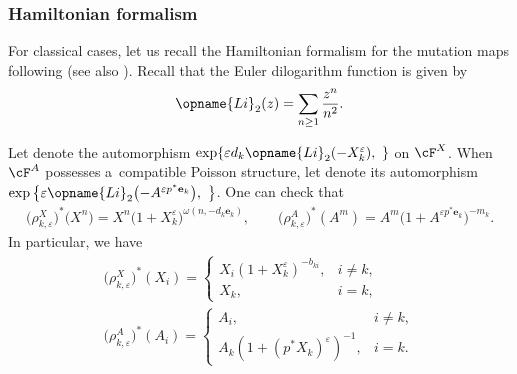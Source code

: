 \documentclass[pdftex]{sigma}
\newcommand{\Li}{\opname{Li}}
\newcommand{\ee}{\mathbf{e}}
\numberwithin{equation}{section}
\begin{document}
\subsubsection*{Hamiltonian formalism}

For classical cases, let us recall the Hamiltonian formalism for the mutation maps following
\cite{gekhtman2017hamiltonian} (see also \cite{FockGoncharov09a,gross2018canonical}). Recall that the Euler dilogarithm function
is given by
\begin{align*}
\Li_{2}(z) =\sum_{n\geq1}\frac{z^{n}}{n^{2}}.
\end{align*}

Let  denote the automorphism $\exp\{\varepsilon d_{k}\Li_{2}(-X_{k}^{\varepsilon}),\ \}$
on $\cF^{X}$. When $\cF^{A}$ possesses a~compatible Poisson structure,
let  denote its automorphism $\exp\big\{\varepsilon\Li_{2}\bigl(-A^{\varepsilon p^{*}\ee_{k}}\bigr),\ \big\}$.
One can check that
\begin{gather*}
\big(\rho_{k,\varepsilon}^{X})^{*}(X^{n}\big) = X^{n}\big(1+X_{k}^{\varepsilon}\big)^{\omega(n,-d_{k}\ee_{k})},\qquad
\big(\rho_{k,\varepsilon}^{A}\big)^{*}(A^{m}) = A^{m}\big(1+A^{\varepsilon p^{*}\ee_{k}}\big)^{-m_{k}}.
\end{gather*}
In particular, we have
\begin{gather*}
\big(\rho_{k,\varepsilon}^{X}\big)^{*}(X_{i}) = \begin{cases}
X_{i}(1+X_{k}^{\varepsilon})^{-b_{ki}}, & i\neq k,\\
X_{k}, & i=k,
\end{cases}\\
\big(\rho_{k,\varepsilon}^{A}\big)^{*}(A_{i}) = \begin{cases}
A_{i}, & i\neq k,\\
A_{k}(1+(p^{*}X_{k})^{\varepsilon})^{-1}, & i=k.
\end{cases}
\end{gather*}
\end{document}
